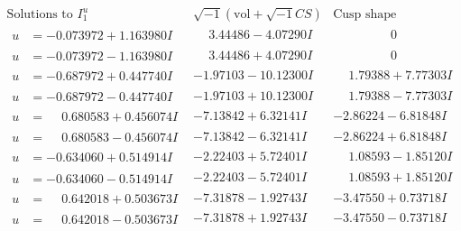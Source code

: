 \documentclass[1p]{elsarticle_modified}
\theoremstyle{definition}
\newcommand{\I}{\sqrt{-1}}
\begin{document}
$$\begin{array}{c|c|c}  
\text{Solutions to }I^u_{1}& \I (\text{vol} + \sqrt{-1}CS) & \text{Cusp shape}\\
 \hline 
\begin{aligned}
u &= -0.073972 + 1.163980 I\end{aligned}
 & \phantom{-}3.44486 - 4.07290 I & \phantom{-0.000000 } 0 \\ \hline\begin{aligned}
u &= -0.073972 - 1.163980 I\end{aligned}
 & \phantom{-}3.44486 + 4.07290 I & \phantom{-0.000000 } 0 \\ \hline\begin{aligned}
u &= -0.687972 + 0.447740 I\end{aligned}
 & -1.97103 - 10.12300 I & \phantom{-}1.79388 + 7.77303 I \\ \hline\begin{aligned}
u &= -0.687972 - 0.447740 I\end{aligned}
 & -1.97103 + 10.12300 I & \phantom{-}1.79388 - 7.77303 I \\ \hline\begin{aligned}
u &= \phantom{-}0.680583 + 0.456074 I\end{aligned}
 & -7.13842 + 6.32141 I & -2.86224 - 6.81848 I \\ \hline\begin{aligned}
u &= \phantom{-}0.680583 - 0.456074 I\end{aligned}
 & -7.13842 - 6.32141 I & -2.86224 + 6.81848 I \\ \hline\begin{aligned}
u &= -0.634060 + 0.514914 I\end{aligned}
 & -2.22403 + 5.72401 I & \phantom{-}1.08593 - 1.85120 I \\ \hline\begin{aligned}
u &= -0.634060 - 0.514914 I\end{aligned}
 & -2.22403 - 5.72401 I & \phantom{-}1.08593 + 1.85120 I \\ \hline\begin{aligned}
u &= \phantom{-}0.642018 + 0.503673 I\end{aligned}
 & -7.31878 - 1.92743 I & -3.47550 + 0.73718 I \\ \hline\begin{aligned}
u &= \phantom{-}0.642018 - 0.503673 I\end{aligned}
 & -7.31878 + 1.92743 I & -3.47550 - 0.73718 I \\ \hline\begin{aligned}

\end{aligned}
\end{array}$$
\end{document}
